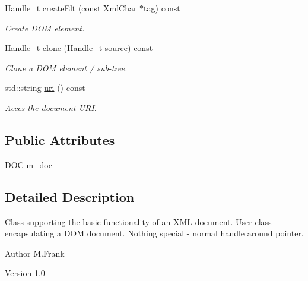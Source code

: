\begin{DoxyCompactItemize}
\hyperlink{class_d_d4hep_1_1_x_m_l_1_1_handle__t}{Handle\_\-t} \hyperlink{class_d_d4hep_1_1_x_m_l_1_1_document_a5fe0eaacbfdbc877890d485fbb92017f}{createElt} (const \hyperlink{namespace_d_d4hep_1_1_x_m_l_a09e5d9cc86ed782f6826dfe0778c1815}{XmlChar} $\ast$tag) const 
\begin{DoxyCompactList}\small\item\em Create DOM element. \item\end{DoxyCompactList}\item 
\hyperlink{class_d_d4hep_1_1_x_m_l_1_1_handle__t}{Handle\_\-t} \hyperlink{class_d_d4hep_1_1_x_m_l_1_1_document_ab2f6b4d0ad9a0b3b063a6a4a3a210bfd}{clone} (\hyperlink{class_d_d4hep_1_1_x_m_l_1_1_handle__t}{Handle\_\-t} source) const 
\begin{DoxyCompactList}\small\item\em Clone a DOM element / sub-\/tree. \item\end{DoxyCompactList}\item 
std::string \hyperlink{class_d_d4hep_1_1_x_m_l_1_1_document_aff1172a369a155c730dd3217d9984c54}{uri} () const 
\begin{DoxyCompactList}\small\item\em Acces the document URI. \item\end{DoxyCompactList}\end{DoxyCompactItemize}
\subsection*{Public Attributes}
\begin{DoxyCompactItemize}
\item 
\hyperlink{class_d_d4hep_1_1_x_m_l_1_1_document_a685ff83de83e9b7b37e79ad846fc2387}{DOC} \hyperlink{class_d_d4hep_1_1_x_m_l_1_1_document_a8fad6eeaaafe3a15002cb16fb0b325a3}{m\_\-doc}
\end{DoxyCompactItemize}


\subsection{Detailed Description}
Class supporting the basic functionality of an \hyperlink{namespace_d_d4hep_1_1_x_m_l}{XML} document. User class encapsulating a DOM document. Nothing special -\/ normal handle around pointer.

\begin{DoxyAuthor}{Author}
M.Frank 
\end{DoxyAuthor}
\begin{DoxyVersion}{Version}
1.0 
\end{DoxyVersion}


